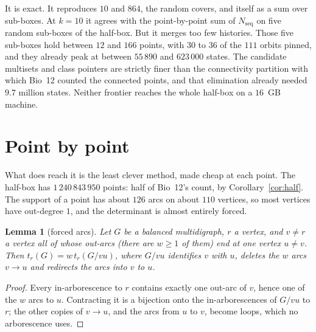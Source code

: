 \documentclass[11pt]{article}
\theoremstyle{plain}
\newtheorem{lemma}[theorem]{Lemma}
\theoremstyle{definition}
\theoremstyle{remark}
\newcommand{\Nseq}{N_{\mathrm{seq}}}
\begin{document}
It is exact. It reproduces $10$ and $864$, the random covers, and itself as a sum over
sub-boxes. At $k=10$ it agrees with the point-by-point sum of $\Nseq$ on five random sub-boxes of
the half-box. But it merges too few histories. Those five sub-boxes hold between $12$ and $166$
points, with $30$ to $36$ of the $111$ orbits pinned, and they already peak at between $55\,890$
and $623\,000$ states. The candidate multisets and class pointers are strictly finer than the
connectivity partition with which Bio~12 counted the connected points, and that elimination
already needed $9.7$ million states. Neither frontier reaches the whole half-box on a
$16$~GB machine.

\section{Point by point}\label{sec:points}

What does reach it is the least clever method, made cheap at each point. The half-box has
$1\,240\,843\,950$ points: half of Bio~12's count, by Corollary~\ref{cor:half}. The support of a
point has about $126$ arcs on about $110$ vertices, so most vertices have out-degree $1$, and
the determinant is almost entirely forced.

\begin{lemma}[forced arcs]\label{lem:forced}
Let $G$ be a balanced multidigraph, $r$ a vertex, and $v\ne r$ a vertex all of whose out-arcs
(there are $w\ge1$ of them) end at one vertex $u\ne v$. Then $t_r(G)=w\,t_r(G/vu)$, where $G/vu$
identifies $v$ with $u$, deletes the $w$ arcs $v\to u$ and redirects the arcs into $v$ to $u$.
\end{lemma}

\begin{proof}
Every in-arborescence to $r$ contains exactly one out-arc of $v$, hence one of the $w$ arcs to
$u$. Contracting it is a bijection onto the in-arborescences of $G/vu$ to $r$; the other copies
of $v\to u$, and the arcs from $u$ to $v$, become loops, which no arborescence uses.
\end{proof}
\end{document}
